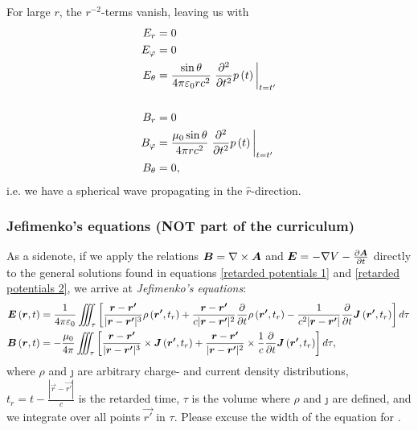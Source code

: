         For large $r$, the $r^{-2}$-terms vanish, leaving us with 
        \begin{align*}
            E_r &= 0\\
            E_\phi &= 0 \\
            E_\theta &= \frac{\sin\theta}{4\pi\e r c^2}\eval{\frac{\partial^2}{\partial t^2} p\left(t\right)}_{t=t'}\\
            &\\
            B_r &= 0 \\
            B_\phi &= \frac{\mu_0 \sin\theta}{4\pi r c^2}\eval{\frac{\partial^2}{\partial t^2} p\left(t\right)}_{t=t'}\\
            B_\theta &= 0,
        \end{align*}
        i.e. we have a spherical wave propagating in the $\hat{r}$-direction. 

    \subsubsection*{Jefimenko's equations (NOT part of the curriculum)}
        As a sidenote, if we apply the relations $\bm{B} = \nabla\times\bm{A}$ and $\bm{E} = -\nabla V - \frac{\partial\bm{A}}{\partial t}$
        directly to the general solutions found in equations \eqref{retarded potentials 1} and \eqref{retarded potentials 2}, we arrive at 
        \textit{Jefimenko's equations}:
        \begin{align*}
            \bm{E}\left(\bm{r}, t\right) &= \frac{1}{4\pi\varepsilon_0}\iiint_\tau \left[
                \frac{\bm{r} - \bm{r'}}{|\bm{r} - \bm{r'}|^3}\rho\left(\bm{r'}, t_r\right)
                + \frac{\bm{r} - \bm{r'}}{c|\bm{r} - \bm{r'}|^2}\frac{\partial}{\partial t}\rho\left(\bm{r'}, t_r\right)
                - \frac{1}{c^2|\bm{r} - \bm{r'}|} \frac{\partial}{\partial t}\bm{J}\left(\bm{r'}, t_r\right)
                \right]d\tau \\
            \bm{B}\left(\bm{r}, t\right) &= -\frac{\mu_0}{4\pi} \iiint_\tau \left[
                \frac{\bm{r} - \bm{r'}}{|\bm{r} - \bm{r'}|^3} \times \bm{J}\left(\bm{r'}, t_r\right)
                + \frac{\bm{r} - \bm{r'}}{|\bm{r} - \bm{r'}|^2} \times \frac{1}{c}\frac{\partial}{\partial t}\bm{J}\left(\bm{r'}, t_r\right)
                \right]d\tau,
        \end{align*}
        where $\rho$ and \j{} are arbitrary charge- and current density distributions, 
        $t_r = t - \frac{|\vec{r} - \vec{r'}|}{c}$ is the retarded time,
        $\tau$ is the volume where $\rho$ and \j{} are defined, 
        and we integrate over all points $\vec{r'}$ in $\tau$. 
        Please excuse the width of the equation for \E{}.

